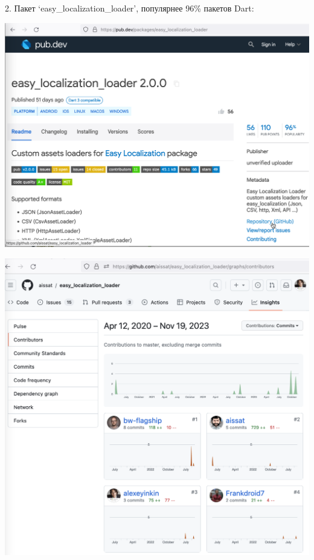2. Пакет `easy\_localization\_loader', популярнее 96\% пакетов Dart:

\begin{center}
    \includegraphics[width=\textwidth]{easy_localization_loader}
\end{center}
\begin{center}
    \includegraphics[width=\textwidth]{easy_localization_loader_contributors}
\end{center}
\pagebreak

